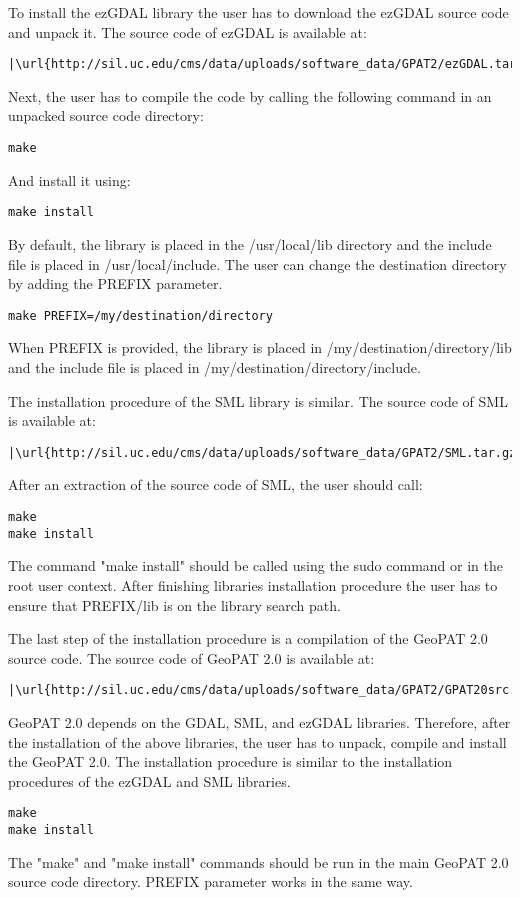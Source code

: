 To install the ezGDAL library the user has to download the ezGDAL source code and unpack it.
The source code of ezGDAL is available at:
\begin{lstlisting}[escapechar=|]
|\url{http://sil.uc.edu/cms/data/uploads/software_data/GPAT2/ezGDAL.tar.gz}|
\end{lstlisting}
Next, the user has to compile the code by calling the following command in an unpacked source code directory:
\begin{lstlisting}
make
\end{lstlisting}
And install it using:
\begin{lstlisting}
make install
\end{lstlisting}
By default, the library is placed in the /usr/local/lib directory and the include file is placed in /usr/local/include.
The user can change the destination directory by adding the PREFIX parameter.
\begin{lstlisting}
make PREFIX=/my/destination/directory
\end{lstlisting}
When PREFIX is provided, the library is placed in /my/destination/directory/lib and the include file is placed in /my/destination/directory/include.

The installation procedure of the SML library is similar.
The source code of SML is available at:
\begin{lstlisting}[escapechar=|]
|\url{http://sil.uc.edu/cms/data/uploads/software_data/GPAT2/SML.tar.gz}|
\end{lstlisting}
After an extraction of the source code of SML, the user should call: 
\begin{lstlisting}
make
make install
\end{lstlisting}
The command "make install" should be called using the sudo command or in the root user context.
After finishing libraries installation procedure the user has to ensure that PREFIX/lib is on the library search path.

The last step of the installation procedure is a compilation of the GeoPAT 2.0 source code.
The source code of GeoPAT 2.0 is available at:
\begin{lstlisting}[escapechar=|]
|\url{http://sil.uc.edu/cms/data/uploads/software_data/GPAT2/GPAT20src.tar.gz}|
\end{lstlisting}
GeoPAT 2.0 depends on the GDAL, SML, and ezGDAL libraries.
Therefore, after the installation of the above libraries, the user has to unpack, compile and install the GeoPAT 2.0.
The installation procedure is similar to the installation procedures of the ezGDAL and SML libraries.
\begin{lstlisting}
make
make install
\end{lstlisting}
The "make" and "make install" commands should be run in the main GeoPAT 2.0 source code directory.
PREFIX parameter works in the same way.

